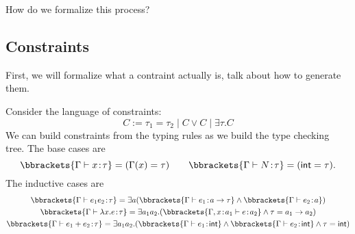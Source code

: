 \documentclass[class=scrartcl]{standalone}
\begin{document}
\begin{question}
  How do we formalize this process?
\end{question}

\subsection{Constraints}
First, we will formalize what a contraint actually is,
talk about how to generate them.

Consider the language of constraints:
\[
  C := \tau_1 = \tau_2 \mid C \lor C
                       \mid \exists \tau. C
\]
We can build constraints from the typing rules
as we build the type checking tree.
The base cases are
\[
  \bbrackets{\Gamma \vdash x \of \tau} = (\Gamma(x) = \tau) \qquad
  \bbrackets{\Gamma \vdash N \of \tau} = (\pint = \tau).
\]
The inductive cases are
\begin{gather*}
  \bbrackets{\Gamma \vdash e_1 e_2 \of \tau}
    = \exists a (\bbrackets{\Gamma \vdash e_1 \of a \to \tau} \land
                 \bbrackets{\Gamma \vdash e_2 \of a}) \\
  \bbrackets{\Gamma \vdash \lambda x. e \of \tau}
    = \exists a_1 a_2. (\bbrackets{\Gamma, x \of a_1 \vdash e \of a_2} \land
                         \tau = a_1 \to a_2) \\
  \bbrackets{\Gamma \vdash e_1 + e_2 \of \tau}
    = \exists a_1 a_2. (\bbrackets{\Gamma \vdash e_1 \of \pint} \land
                        \bbrackets{\Gamma \vdash e_2 \of \pint} \land
                        \tau = \pint)
\end{gather*}
\end{document}
